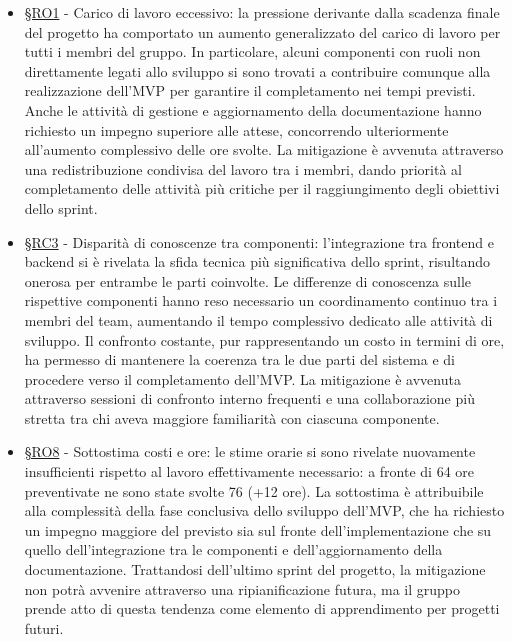 \documentclass[10pt, letterpaper]{article}
\newcommand{\rif}[1]{\hyperref[#1]{§#1}}
\begin{document}
    \begin{itemize}
    \item \rif{RO1} - Carico di lavoro eccessivo: la pressione derivante dalla scadenza finale del progetto ha comportato un aumento generalizzato del carico di lavoro per tutti i membri del gruppo. In particolare, alcuni componenti con ruoli non direttamente legati allo sviluppo si sono trovati a contribuire comunque alla realizzazione dell'MVP per garantire il completamento nei tempi previsti. Anche le attività di gestione e aggiornamento della documentazione hanno richiesto un impegno superiore alle attese, concorrendo ulteriormente all'aumento complessivo delle ore svolte. La mitigazione è avvenuta attraverso una redistribuzione condivisa del lavoro tra i membri, dando priorità al completamento delle attività più critiche per il raggiungimento degli obiettivi dello sprint.

    \item \rif{RC3} - Disparità di conoscenze tra componenti: l'integrazione tra frontend e backend si è rivelata la sfida tecnica più significativa dello sprint, risultando onerosa per entrambe le parti coinvolte. Le differenze di conoscenza sulle rispettive componenti hanno reso necessario un coordinamento continuo tra i membri del team, aumentando il tempo complessivo dedicato alle attività di sviluppo. Il confronto costante, pur rappresentando un costo in termini di ore, ha permesso di mantenere la coerenza tra le due parti del sistema e di procedere verso il completamento dell'MVP. La mitigazione è avvenuta attraverso sessioni di confronto interno frequenti e una collaborazione più stretta tra chi aveva maggiore familiarità con ciascuna componente.

    \item \rif{RO8} - Sottostima costi e ore: le stime orarie si sono rivelate nuovamente insufficienti rispetto al lavoro effettivamente necessario: a fronte di 64 ore preventivate ne sono state svolte 76 (+12 ore). La sottostima è attribuibile alla complessità della fase conclusiva dello sviluppo dell'MVP, che ha richiesto un impegno maggiore del previsto sia sul fronte dell'implementazione che su quello dell'integrazione tra le componenti e dell'aggiornamento della documentazione. Trattandosi dell'ultimo sprint del progetto, la mitigazione non potrà avvenire attraverso una ripianificazione futura, ma il gruppo prende atto di questa tendenza come elemento di apprendimento per progetti futuri.
\end{itemize}
\end{document}
